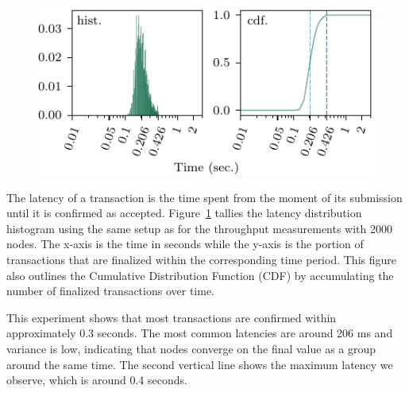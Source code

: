 \begin{figure}
\includegraphics[width=\linewidth]{figures/lat.pdf}
\label{fig:eval-lat1}
\end{figure}

The latency of a transaction is the time spent from the moment of its
submission until it is confirmed as accepted.
Figure~\ref{fig:eval-lat1} tallies
the latency distribution histogram using the same setup as for the throughput
measurements with 2000 nodes. The x-axis is the time in seconds while the y-axis
is the portion of transactions that are finalized within the corresponding
time period. This figure also outlines the Cumulative Distribution Function (CDF)
by accumulating the number of finalized transactions over time.


This experiment shows that most transactions are confirmed within approximately 0.3 seconds.
The most common latencies are around 206 ms and variance is low,
indicating that nodes converge on the final value as a group around the same time.
The second vertical line shows the maximum latency we observe, which is around 0.4 seconds.

